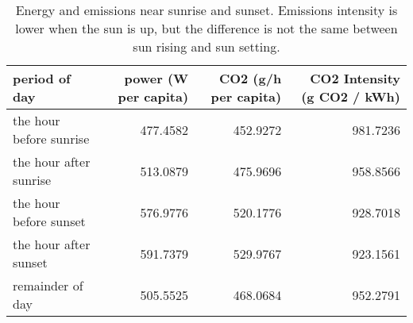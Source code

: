 \begin{table}

\caption{\label{tab:sunrise emissions stats}Energy and emissions near sunrise and sunset. Emissions intensity is lower when the sun is up, but the difference is not the same between sun rising and sun setting.}
\centering
\begin{tabular}[t]{l|r|r|r}
\hline
period of day & power (W per capita) & CO2 (g/h per capita) & CO2 Intensity (g CO2 / kWh)\\
\hline
the hour before sunrise & 477.4582 & 452.9272 & 981.7236\\
\hline
the hour after sunrise & 513.0879 & 475.9696 & 958.8566\\
\hline
the hour before sunset & 576.9776 & 520.1776 & 928.7018\\
\hline
the hour after sunset & 591.7379 & 529.9767 & 923.1561\\
\hline
remainder of day & 505.5525 & 468.0684 & 952.2791\\
\hline
\end{tabular}
\end{table}
